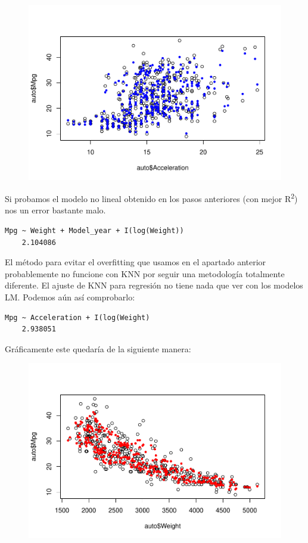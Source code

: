 \begin{figure}[H]\includegraphics[width=.9\linewidth]{img/Regresion_files/figure-latex/unnamed-chunk-29-2} \caption{}\end{figure}

Si probamos el modelo no lineal obtenido en los pasos anteriores (con mejor R\textsuperscript{2}) nos un error bastante malo.
\begin{verbatim}
Mpg ~ Weight + Model_year + I(log(Weight))
    2.104086
\end{verbatim}

\vspace{\baselineskip}

El método para evitar el overfitting que usamos en el apartado anterior probablemente no funcione con KNN por seguir una metodología totalmente diferente. El ajuste de KNN para regresión no tiene nada que ver con los modelos LM. Podemos aún así comprobarlo:
\begin{verbatim}
Mpg ~ Acceleration + I(log(Weight)
    2.938051
\end{verbatim}

\vspace{\baselineskip}

Gráficamente este quedaría de la siguiente manera:
\begin{figure}[H]\includegraphics[width=.9\linewidth]{img/Regresion_files/figure-latex/unnamed-chunk-32-1} \caption{}\end{figure}

